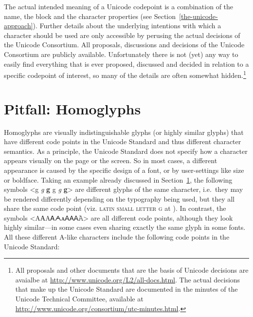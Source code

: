 The actual intended meaning of a Unicode codepoint is a combination of the
name, the block and the character properties (see
Section~\ref{the-unicode-approach}). Further details about the underlying intentions 
with which a character should be used
are only accessible by perusing the actual decisions of the Unicode Consortium.
All proposals, discussions and decisions of the Unicode Consortium are publicly
available. Unfortunately there is not (yet) any way to easily find everything
that is ever proposed, discussed and decided in relation to a specific
codepoint of interest, so many of the details are often somewhat
hidden.\footnote{All proposals and other documents that are the basis of Unicode
decisions are avaialbe at \url{http://www.unicode.org/L2/all-docs.html}. The
actual decisions that make up the Unicode Standard are documented in the minutes
of the Unicode Technical Committee, available at
\url{http://www.unicode.org/consortium/utc-minutes.html}.}

\section{Pitfall: Homoglyphs}
\label{pitfall-homoglyphs}

Homoglyphs are visually indistinguishable glyphs (or highly similar glyphs) that
have different code points in the Unicode Standard and thus different character
semantics. As a principle, the Unicode Standard does not specify how a character
appears visually on the page or the screen. So in most cases, a different
appearance is caused by the specific design of a font, or by user-settings like
size or boldface. Taking an example already discussed in
Section~\ref{pitfall-homoglyphs}, the following symbols <g {\large \textit{g}}
\textbf{g} { {\small g} \textit{g} \textbf{g}}> are different
glyphs of the same character, i.e.~they may be rendered differently depending on
the typography being used, but they all share the same code point (viz.
\textsc{latin small letter g} at ). In contrast, the symbols
<{AАΑᎪᗅᴀꓮ𐊠𝖠𝙰}> are all different code points,
although they look highly similar---in some cases even sharing exactly the same
glyph in some fonts. All these different A-like characters include the following
code points in the Unicode Standard:

